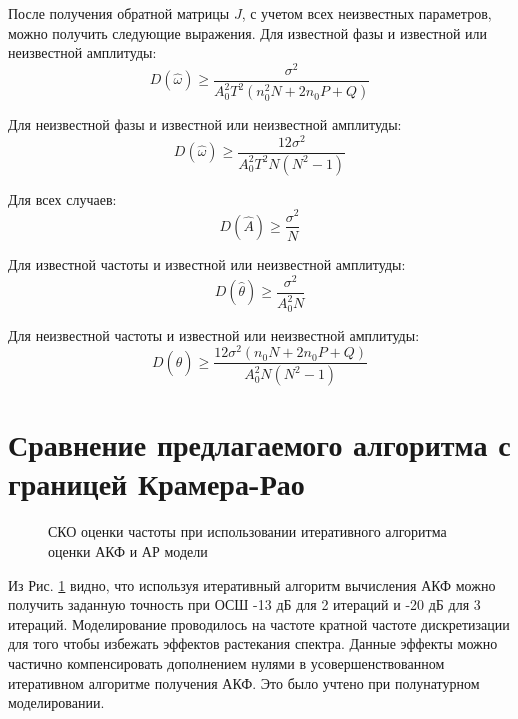 После получения обратной матрицы ${J}$, с учетом всех неизвестных параметров, можно получить следующие выражения.
Для известной фазы и известной или неизвестной амплитуды:
\begin{equation}
	\label{eq:clrb_est_omega_1}
	D(\hat{\omega}) \ge \frac{\sigma^2}{A_0^2 T^2 (n_0^2 N + 2n_0P + Q)}
\end{equation}

Для неизвестной фазы и известной или неизвестной амплитуды:
\begin{equation}
	\label{eq:clrb_est_omega_2}
	D(\hat{\omega}) \ge \frac{12\sigma^2}{A_0^2 T^2N(N^2-1)}
\end{equation}

Для всех случаев:
\begin{equation}
	\label{eq:clrb_est_b_1}
	D(\hat{A}) \ge \frac{\sigma^2}{N}
\end{equation}

Для известной частоты и известной или неизвестной амплитуды:
\begin{equation}
	\label{eq:clrb_est_b_1}
	D(\hat{\theta}) \ge \frac{\sigma^2}{A_0^2N}
\end{equation}

Для неизвестной частоты и известной или неизвестной амплитуды:
\begin{equation}
	\label{eq:clrb_est_b_1}
	D(\hat{\theta}) \ge \frac{12\sigma^2(n_0N + 2n_0P + Q)}{A_0^2N(N^2-1)}
\end{equation}

\section{Сравнение предлагаемого алгоритма с границей Крамера-Рао}
\begin{figure}[h]
\center{}
	\caption{СКО оценки частоты при использовании итеративного алгоритма оценки АКФ и АР модели}
	\label{pic:crlb_vs_algorithm}
\end{figure}

Из Рис. \ref{pic:crlb_vs_algorithm} видно, что используя итеративный алгоритм вычисления АКФ можно получить заданную точность
при ОСШ -13 дБ для 2 итераций и -20 дБ для 3 итераций. Моделирование проводилось на частоте кратной частоте дискретизации для
того чтобы избежать эффектов растекания спектра. Данные эффекты можно частично компенсировать дополнением нулями в
усовершенствованном итеративном алгоритме получения АКФ. Это было учтено при полунатурном моделировании.

